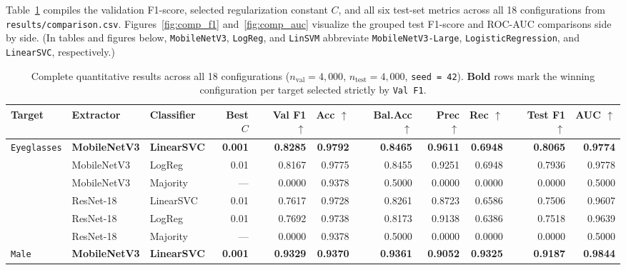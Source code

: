 \documentclass[12pt,a4paper]{article}
\newcommand{\code}[1]{\texttt{#1}}
\begin{document}
Table~\ref{tab:main_results} compiles the validation F1-score, selected regularization constant $C$, and all six test-set metrics across all 18 configurations from \code{results/\allowbreak{}comparison.csv}. Figures~\ref{fig:comp_f1} and~\ref{fig:comp_auc} visualize the grouped test F1-score and ROC-AUC comparisons side by side. (In tables and figures below, \code{MobileNetV3}, \code{LogReg}, and \code{LinSVM} abbreviate \code{MobileNetV3-Large}, \code{LogisticRegression}, and \code{LinearSVC}, respectively.)

\begin{table}[H]
  \centering
  \caption[Quantitative results across all 18 configurations]{Complete quantitative results across all 18 configurations ($n_{\text{val}} = 4{,}000$, $n_{\text{test}} = 4{,}000$, \code{seed = 42}). \textbf{Bold} rows mark the winning configuration per target selected strictly by \code{Val F1}.}
  \label{tab:main_results}
  \scriptsize
  \setlength{\tabcolsep}{3.4pt}
  \begin{tabular}{@{}l l l r r r r r r r r@{}}
    \toprule
    \textbf{Target} & \textbf{Extractor} & \textbf{Classifier} & \textbf{Best $C$} & \textbf{Val F1 $\uparrow$} & \textbf{Acc $\uparrow$} & \textbf{Bal.Acc $\uparrow$} & \textbf{Prec $\uparrow$} & \textbf{Rec $\uparrow$} & \textbf{Test F1 $\uparrow$} & \textbf{AUC $\uparrow$} \\
    \midrule
    \multirow{6}{*}{\code{Eyeglasses}}
      & \textbf{MobileNetV3} & \textbf{LinearSVC} & \textbf{0.001} & \textbf{0.8285} & \textbf{0.9792} & \textbf{0.8465} & \textbf{0.9611} & \textbf{0.6948} & \textbf{0.8065} & \textbf{0.9774} \\
      & MobileNetV3 & LogReg    & 0.01  & 0.8167 & 0.9775 & 0.8455 & 0.9251 & 0.6948 & 0.7936 & 0.9778 \\
      & MobileNetV3 & Majority  & ---   & 0.0000 & 0.9378 & 0.5000 & 0.0000 & 0.0000 & 0.0000 & 0.5000 \\
      & ResNet-18   & LinearSVC & 0.01  & 0.7617 & 0.9728 & 0.8261 & 0.8723 & 0.6586 & 0.7506 & 0.9607 \\
      & ResNet-18   & LogReg    & 0.01  & 0.7692 & 0.9738 & 0.8173 & 0.9138 & 0.6386 & 0.7518 & 0.9639 \\
      & ResNet-18   & Majority  & ---   & 0.0000 & 0.9378 & 0.5000 & 0.0000 & 0.0000 & 0.0000 & 0.5000 \\
    \midrule
    \multirow{6}{*}{\code{Male}}
      & \textbf{MobileNetV3} & \textbf{LinearSVC} & \textbf{0.001} & \textbf{0.9329} & \textbf{0.9370} & \textbf{0.9361} & \textbf{0.9052} & \textbf{0.9325} & \textbf{0.9187} & \textbf{0.9844} \\

\end{tabular}
\end{table}
\end{document}
